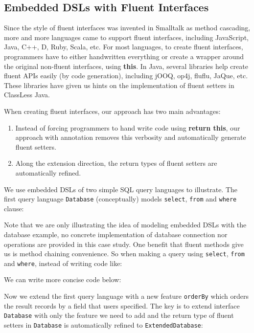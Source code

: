 \subsection{Embedded DSLs with Fluent Interfaces}
Since the style of fluent interfaces was invented in Smalltalk as method
cascading, more and more languages came to support fluent interfaces, including
JavaScript, Java, C++, D, Ruby, Scala, etc. For most languages, to create fluent
interfaces, programmers have to either handwritten everything or create a
wrapper around the original non-fluent interfaces, using \textbf{this}. In Java,
several libraries help create fluent APIs easily (by code generation), including
jOOQ, op4j, fluflu, JaQue, etc. These libraries have given us hints on the
implementation of fluent setters in ClassLess Java.

When creating fluent interfaces, our approach has two main advantages:
\begin{enumerate}
\item Instead of forcing programmers to hand write code using \textbf{return
    this}, our approach with \mixin annotation removes this verbosity and
  automatically generate fluent setters.
\item Along the extension direction, the return types of fluent setters are
  automatically refined.
\end{enumerate} 

\noindent We use embedded DSLs of two simple SQL query languages to illustrate.
The first query language \texttt{Database} (conceptually) models
\texttt{select}, \texttt{from} and \texttt{where} clause:

\noindent Note that we are only illustrating the idea of modeling embedded DSLs
with the database example, no concrete implementation of database connection nor
operations are provided in this case study. One benefit that fluent methods give
us is method chaining convenience. So when making a query using \texttt{select},
\texttt{from} and \texttt{where}, instead of writing code like:

\noindent We can write more concise code below:

\noindent Now we extend the first query language with a new feature
\texttt{orderBy} which orders the result records by a field that users
specified. The key is to extend interface \texttt{Database} with only the
feature we need to add and the return type of fluent setters in
\texttt{Database} is automatically refined to \texttt{ExtendedDatabase}:



